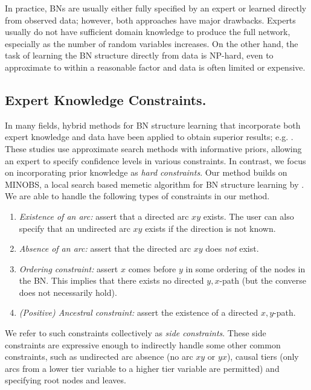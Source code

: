 \documentclass[twoside,11pt]{article}
\begin{document}
\smallskip
In practice, BNs are usually either fully specified by an expert or learned directly from observed data; however,
both approaches have major drawbacks. Experts usually do not have sufficient domain knowledge to produce the
full network, especially as the number of random variables increases. On the other hand, the task of learning the 
BN structure directly from data is NP-hard, even to approximate to within a reasonable factor 
\citep{ChickeringMH03,Dasgupta1999} and data is often limited or expensive.

\subsection{Expert Knowledge Constraints.}
In many fields, hybrid methods for BN structure learning that incorporate both expert knowledge and data
have been applied to obtain superior results; e.g. \cite{Flores2011, Sesen2013, Oyen2016, Antal2004}. These studies use approximate
search methods with informative priors, allowing an expert to specify confidence levels in various constraints. 
In contrast, we focus on incorporating prior knowledge as \emph{hard constraints}. Our method builds on MINOBS, a local search based
memetic algorithm for BN structure learning by \cite{Lee2017}. We are able to handle the following types of constraints in our
method.

\begin{enumerate}[label=({\arabic*})]
	\itemsep0em
	\item \emph{Existence of an arc:} assert that a directed arc $xy$ exists. The user can also specify that an undirected arc $xy$ exists if the direction is not known.
	
	\item \emph{Absence of an arc:} assert that the directed arc $xy$ does \emph{not} exist. 
	
	\item \emph{Ordering constraint:} assert $x$ comes before $y$ in some ordering of the nodes in the BN. This implies that there exists no directed $y, x$-path (but the converse does not necessarily hold).
	
	\item \emph{(Positive) Ancestral constraint:} assert the existence of a directed $x, y$-path. 

\end{enumerate}

We refer to such constraints collectively as \emph{side constraints}.
These side constraints are expressive enough to indirectly handle some other common constraints, such as undirected arc absence (no arc $xy$ or $yx$),
causal tiers (only arcs from a lower tier variable to a higher tier variable are permitted) and specifying root nodes and leaves. 
\end{document}
